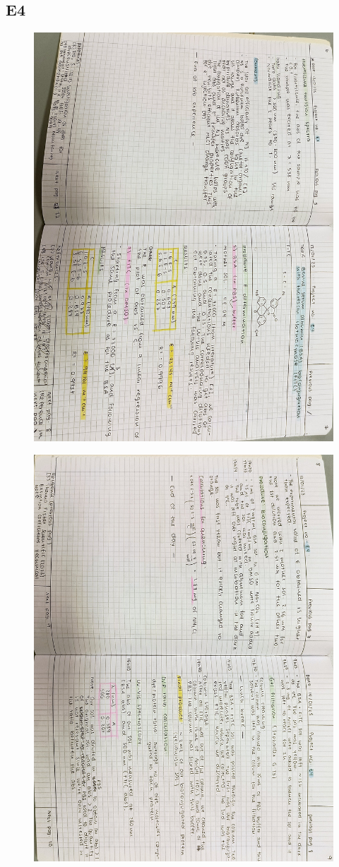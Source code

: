 \subsection{E4}
\begin{figure}[H]
	\centering
	\includegraphics[width=0.6\linewidth, angle=90]{../images/compressed/IMG20250123172914.jpg}
\end{figure}
\begin{figure}[H]
	\centering
	\includegraphics[width=0.6\linewidth, angle=90]{../images/compressed/IMG20250123172932.jpg}
\end{figure}


